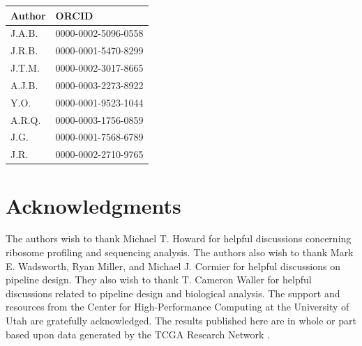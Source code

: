 \documentclass[10pt, oneside]{article}
\newcommand{\beginsupplement}{%
  \setcounter{table}{0}
  \renewcommand{\thetable}{S\arabic{table}}%
  \setcounter{figure}{0}
  \renewcommand{\thefigure}{S\arabic{figure}}%
}
\begin{document}
\begin{table}[!]
    \centering
{}
\begin{tabular}{p{1.5cm}p{4cm}}
 \textbf{Author} & \textbf{ORCID}\\
 \hline
 J.A.B. & 0000-0002-5096-0558 \\
 \hline
 J.R.B. & 0000-0001-5470-8299 \\
 \hline
 J.T.M. & 0000-0002-3017-8665 \\
 \hline
 A.J.B. & 0000-0003-2273-8922 \\
 \hline
 Y.O. & 0000-0001-9523-1044 \\
 \hline
 A.R.Q. & 0000-0003-1756-0859 \\
 \hline
 J.G. & 0000-0001-7568-6789 \\
 \hline
 J.R. & 0000-0002-2710-9765 \\
\end{tabular}
\end{table}

\section*{Acknowledgments}
The authors wish to thank Michael T. Howard for helpful discussions concerning ribosome profiling and sequencing analysis. The authors also wish to thank Mark E. Wadsworth, Ryan Miller, and Michael J. Cormier for helpful discussions on pipeline design. They also wish to thank T. Cameron Waller for helpful discussions related to pipeline design and biological analysis. The support and resources from the Center for High-Performance Computing at the University of Utah are gratefully acknowledged. The results published here are in whole or part based upon data generated by the TCGA Research Network \cite{tcga}.




\beginsupplement
\end{document}
